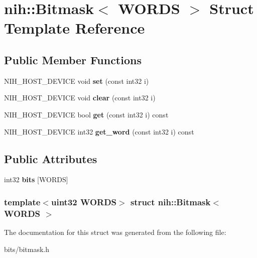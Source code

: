 \hypertarget{structnih_1_1_bitmask}{
\section{nih\-:\-:\-Bitmask$<$ \-W\-O\-R\-D\-S $>$ \-Struct \-Template \-Reference}
\label{structnih_1_1_bitmask}
}
\subsection*{\-Public \-Member \-Functions}
\begin{DoxyCompactItemize}
\item 
\hypertarget{structnih_1_1_bitmask_acacfdbb635fda2c7a5e8b28b8ca538bb}{
\-N\-I\-H\-\_\-\-H\-O\-S\-T\-\_\-\-D\-E\-V\-I\-C\-E void {\bfseries set} (const int32 i)}
\label{structnih_1_1_bitmask_acacfdbb635fda2c7a5e8b28b8ca538bb}

\item 
\hypertarget{structnih_1_1_bitmask_a33880c9c38980610739de2178c564f30}{
\-N\-I\-H\-\_\-\-H\-O\-S\-T\-\_\-\-D\-E\-V\-I\-C\-E void {\bfseries clear} (const int32 i)}
\label{structnih_1_1_bitmask_a33880c9c38980610739de2178c564f30}

\item 
\hypertarget{structnih_1_1_bitmask_a33253dbd0bc07e2cacc3693b9a29d8f1}{
\-N\-I\-H\-\_\-\-H\-O\-S\-T\-\_\-\-D\-E\-V\-I\-C\-E bool {\bfseries get} (const int32 i) const }
\label{structnih_1_1_bitmask_a33253dbd0bc07e2cacc3693b9a29d8f1}

\item 
\hypertarget{structnih_1_1_bitmask_a14fc25c06cf7b27c2e05d8c7b9af5113}{
\-N\-I\-H\-\_\-\-H\-O\-S\-T\-\_\-\-D\-E\-V\-I\-C\-E int32 {\bfseries get\-\_\-word} (const int32 i) const }
\label{structnih_1_1_bitmask_a14fc25c06cf7b27c2e05d8c7b9af5113}

\end{DoxyCompactItemize}
\subsection*{\-Public \-Attributes}
\begin{DoxyCompactItemize}
\item 
\hypertarget{structnih_1_1_bitmask_ac98bead7d7eb79b44c2bb049985aa883}{
int32 {\bfseries bits} \mbox{[}\-W\-O\-R\-D\-S\mbox{]}}
\label{structnih_1_1_bitmask_ac98bead7d7eb79b44c2bb049985aa883}

\end{DoxyCompactItemize}
\subsubsection*{template$<$uint32 \-W\-O\-R\-D\-S$>$ struct nih\-::\-Bitmask$<$ W\-O\-R\-D\-S $>$}



\-The documentation for this struct was generated from the following file\-:\begin{DoxyCompactItemize}
\item 
bits/bitmask.\-h\end{DoxyCompactItemize}
